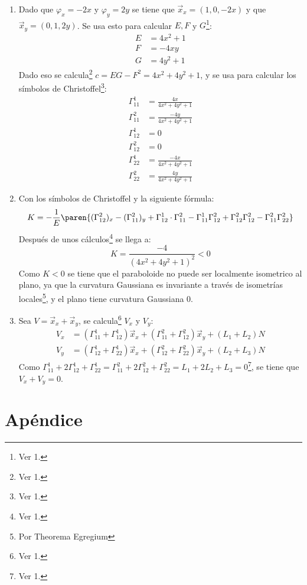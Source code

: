 \documentclass{homework}
\begin{document}
\begin{sol}
    \begin{enumerate}
        \item Dado que \(\varphi_x=-2x\) y \(\varphi_y=2y\) se tiene que \(\vec{x}_x=(1,0,-2x)\) y que \(\vec{x}_y=(0,1,2y)\). Se usa esto para calcular \(E,F\) y \(G\)\footnote{Ver 1.}:
        \begin{align*}
            E&=4x^2+1\\
            F&=-4xy\\
            G&=4y^2+1
        \end{align*}
        Dado eso se calcula\footnote{Ver 1.} \(c=EG-F^2=4x^2+4y^2+1\), y se usa para calcular los símbolos de Christoffel\footnote{Ver 1.}:
        \begin{align*}
            \Gamma^1_{1 1}&=\frac{4x}{4x^2+4y^2+1}\\
            \Gamma^2_{1 1}&=\frac{-4y}{4x^2+4y^2+1}\\
            \Gamma^1_{1 2}&=0\\
            \Gamma^2_{1 2}&=0\\
            \Gamma^1_{2 2}&=\frac{-4x}{4x^2+4y^2+1}\\
            \Gamma^2_{2 2}&=\frac{4y}{4x^2+4y^2+1}
        \end{align*}
        \item Con los símbolos de Christoffel y la siguiente fórmula:
        \begin{equation*}
            K=-\frac1{E}\paren{(\Gamma^2_{1 2})_x-(\Gamma^2_{1 1})_y+\Gamma^1_{1 2}\cdot\Gamma^2_{1 1}-\Gamma^1_{1 1}\Gamma^2_{1 2}+\Gamma^2_{1 2}\Gamma^2_{1 2}-\Gamma^2_{1 1}\Gamma^2_{2 2}}
        \end{equation*}
        Después de unos cálculos\footnote{Ver 1.} se llega a:
        \begin{equation*}
            K=\frac{-4}{(4x^2+4y^2+1)^2}<0
        \end{equation*}
        Como \(K<0\) se tiene que el paraboloide no puede ser localmente isometrico al plano, ya que la curvatura Gaussiana es invariante a través de isometrías locales\footnote{Por Theorema Egregium}, y el plano tiene curvatura Gaussiana \(0\).
        \item Sea \(V=\vec{x}_x+\vec{x}_y\), se calcula\footnote{Ver 1.} \(V_x\) y \(V_y\):
        \begin{align*}
            V_x&=(\Gamma^1_{1 1}+\Gamma^1_{1 2})\vec{x}_x+(\Gamma^2_{1 1}+\Gamma^2_{1 2})\vec{x}_y+(L_1+L_2)N\\
            V_y&=(\Gamma^1_{1 2}+\Gamma^1_{2 2})\vec{x}_x+(\Gamma^2_{1 2}+\Gamma^2_{2 2})\vec{x}_y+(L_2+L_3)N
        \end{align*}
        Como \(\Gamma^1_{1 1}+2\Gamma^1_{1 2}+\Gamma^1_{2 2}=\Gamma^2_{1 1}+2\Gamma^2_{1 2}+\Gamma^2_{2 2}=L_1+2L_2+L_3=0\)\footnote{Ver 1.}, se tiene que \(V_x+V_y=0\).
    \end{enumerate}
\end{sol}


\section*{Apéndice}
\begin{center}
    
\end{center}
\end{document}
